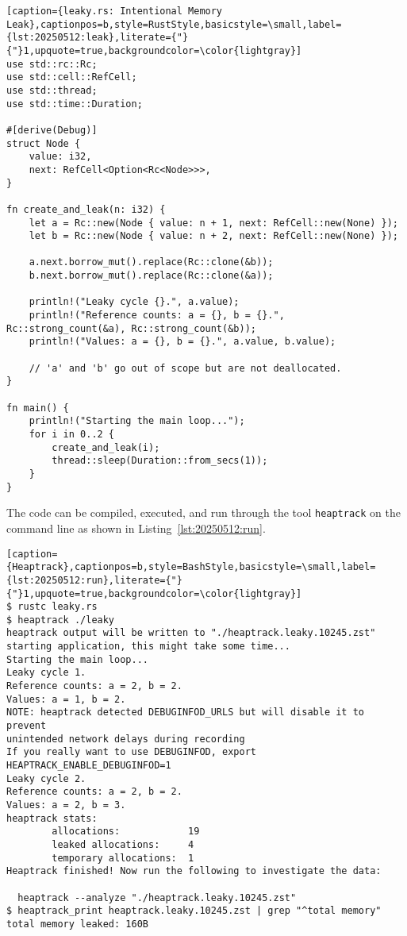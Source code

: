 \begin{lstlisting}[caption={leaky.rs: Intentional Memory Leak},captionpos=b,style=RustStyle,basicstyle=\small,label={lst:20250512:leak},literate={"}{"}1,upquote=true,backgroundcolor=\color{lightgray}]
use std::rc::Rc;
use std::cell::RefCell;
use std::thread;
use std::time::Duration;

#[derive(Debug)]
struct Node {
    value: i32,
    next: RefCell<Option<Rc<Node>>>,
}

fn create_and_leak(n: i32) {
    let a = Rc::new(Node { value: n + 1, next: RefCell::new(None) });
    let b = Rc::new(Node { value: n + 2, next: RefCell::new(None) });

    a.next.borrow_mut().replace(Rc::clone(&b));
    b.next.borrow_mut().replace(Rc::clone(&a));

    println!("Leaky cycle {}.", a.value);
    println!("Reference counts: a = {}, b = {}.", Rc::strong_count(&a), Rc::strong_count(&b));
    println!("Values: a = {}, b = {}.", a.value, b.value);

    // 'a' and 'b' go out of scope but are not deallocated.
}

fn main() {
    println!("Starting the main loop...");
    for i in 0..2 {
        create_and_leak(i);
        thread::sleep(Duration::from_secs(1));
    }
}
\end{lstlisting}

The code can be compiled, executed, and run through the tool \texttt{heaptrack} on the command line as shown in Listing~\ref{lst:20250512:run}.

\begin{lstlisting}[caption={Heaptrack},captionpos=b,style=BashStyle,basicstyle=\small,label={lst:20250512:run},literate={"}{"}1,upquote=true,backgroundcolor=\color{lightgray}]
$ rustc leaky.rs
$ heaptrack ./leaky
heaptrack output will be written to "./heaptrack.leaky.10245.zst"
starting application, this might take some time...
Starting the main loop...
Leaky cycle 1.
Reference counts: a = 2, b = 2.
Values: a = 1, b = 2.
NOTE: heaptrack detected DEBUGINFOD_URLS but will disable it to prevent
unintended network delays during recording
If you really want to use DEBUGINFOD, export HEAPTRACK_ENABLE_DEBUGINFOD=1
Leaky cycle 2.
Reference counts: a = 2, b = 2.
Values: a = 2, b = 3.
heaptrack stats:
        allocations:            19
        leaked allocations:     4
        temporary allocations:  1
Heaptrack finished! Now run the following to investigate the data:

  heaptrack --analyze "./heaptrack.leaky.10245.zst"
$ heaptrack_print heaptrack.leaky.10245.zst | grep "^total memory"
total memory leaked: 160B
\end{lstlisting}

